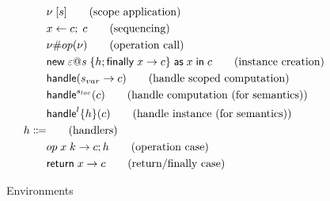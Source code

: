{\begin{figure}
{\begin{minipage}{14 cm}
\begin{align*}
									& \nu \; [ s ]										\tag{scope application} \\
									& x \leftarrow c ;\; c							\tag{sequencing} \\
									& \nu \# op(\nu)							\tag{operation call} \\
									& \mathsf{new} \; \varepsilon @ s \; \{ h ; \mathsf{finally} \; x \rightarrow c \} \; \mathsf{as} \; x \;\mathsf{in}\; c		\tag{instance creation} \\
									& \mathsf{handle} ( s_{var} \rightarrow c )										\tag{handle scoped computation} \\
									& \mathsf{handle}^{s_{loc}} ( c )								\tag{handle computation (for semantics)} \\
									& \mathsf{handle}^{l} \{ h \} ( c )	\tag{handle instance (for semantics)} \\
	h \Coloneqq 		&															\tag{handlers} \\
									& op \; x \; k \rightarrow c ; h	\tag{operation case} \\
									& \mathsf{return} \; x \rightarrow c								\tag{return/finally case} \\
\end{align*}
\label{fig:syntax-calc}
\end{minipage}
}
\end{figure}

\begin{figure}
\caption{Environments}
\centering
{}
\end{figure}

}
